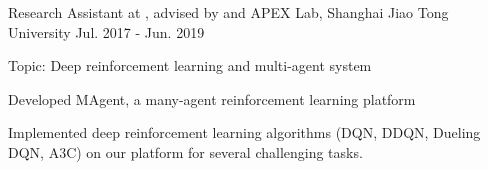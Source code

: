 \begin{cventries}
\cventry
    {Research Assistant at , advised by  and } %
    {APEX Lab, Shanghai Jiao Tong University} %
    {Jul. 2017 - Jun. 2019} %
    {} %
    {
      \begin{cvitems} %
      \item{Topic: Deep reinforcement learning and multi-agent system}
      \item {Developed MAgent, a many-agent reinforcement learning platform}
      \item {Implemented deep reinforcement learning algorithms (DQN, DDQN, Dueling DQN, A3C) on our platform for several challenging tasks.}
      \end{cvitems}
    }
\end{cventries}
